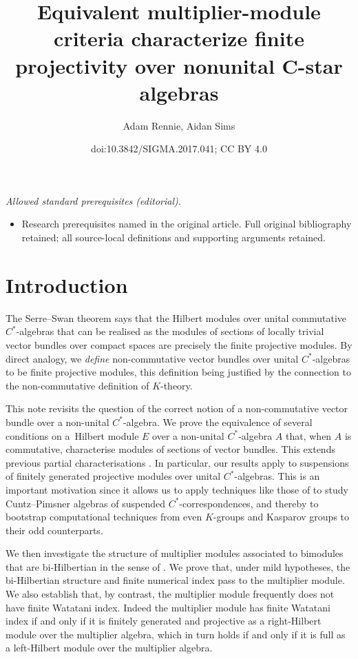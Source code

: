 \documentclass[10pt,a4paper]{amsart}
\title{Equivalent multiplier-module criteria characterize finite projectivity over nonunital C-star algebras}
\author{Adam Rennie, Aidan Sims}
\date{doi:10.3842/SIGMA.2017.041; CC BY 4.0}
\numberwithin{equation}{section}
\begin{document}
\maketitle
\noindent\textit{Allowed standard prerequisites (editorial).}\begin{itemize}
\item Research prerequisites named in the original article. Full original bibliography retained; all source-local definitions and supporting arguments retained.
\end{itemize}\medskip
\section{Introduction}\label{sec:intro}

The Serre--Swan theorem says that the Hilbert modules over unital commutative $C^*$-algebras that can be realised as the modules of sections of locally trivial vector bundles over compact spaces are precisely the f\/inite projective modules. By direct analogy, we \emph{define} non-commutative vector bundles over unital $C^*$-algebras to be f\/inite projective modules, this def\/inition being justif\/ied by the connection to the non-commutative def\/inition of $K$-theory.

This note revisits the question of the correct notion of a non-commutative vector bundle over a non-unital $C^*$-algebra. We prove the equivalence of several conditions on a~Hilbert module $E$ over a non-unital $C^*$-algebra $A$ that, when $A$ is commutative, characterise modules of sections of vector bundles. This extends previous partial characterisations \cite{RennieSmooth}. In particular, our results apply to suspensions of f\/initely generated projective modules over unital $C^*$-algebras. This is an important motivation since it allows us to apply techniques like those of \cite{RRSext} to study Cuntz--Pimsner algebras of suspended $C^*$-correspondences, and thereby to bootstrap computational techniques from even $K$-groups and Kasparov groups to their odd counterparts.

We then investigate the structure of multiplier modules associated to bimodules that are bi-Hilbertian in the sense of \cite{KajPinWat}. We prove that, under mild hypotheses, the bi-Hilbertian structure and f\/inite numerical index pass to the multiplier module. We also establish that, by contrast, the multiplier module frequently does not have f\/inite Watatani index. Indeed the multiplier module has f\/inite Watatani index if and only if it is f\/initely generated and projective as a right-Hilbert module over the multiplier algebra, which in turn holds if and only if it is full as a left-Hilbert module over the multiplier algebra.
\end{document}
